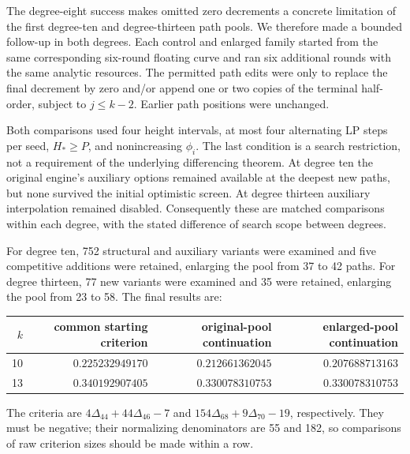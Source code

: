 \documentclass[11pt,letterpaper]{article}
\numberwithin{equation}{section}
\begin{document}
The degree-eight success makes omitted zero decrements a concrete limitation
of the first degree-ten and degree-thirteen path pools. We therefore made a
bounded follow-up in both degrees. Each control and enlarged family started
from the same corresponding six-round floating curve and ran six additional
rounds with the same analytic resources. The permitted path edits were only
to replace the final decrement by zero and/or append one or two copies of
the terminal half-order, subject to $j\le k-2$. Earlier path positions were
unchanged.

Both comparisons used four height intervals, at most four alternating LP
steps per seed, $H_*\ge P$, and nonincreasing $\phi_i$. The last condition
is a search restriction, not a requirement of the underlying differencing
theorem. At degree ten the original engine's auxiliary options remained
available at the deepest new paths, but none survived the initial optimistic
screen. At degree thirteen auxiliary interpolation remained disabled.
Consequently these are matched comparisons within each degree, with the
stated difference of search scope between degrees.

For degree ten, 752 structural and auxiliary variants were examined and
five competitive additions were retained, enlarging the pool from 37 to 42
paths. For degree thirteen, 77 new variants were examined and 35 were
retained, enlarging the pool from 23 to 58. The final results are:
\begin{center}
\small
\begin{tabular}{rrrr}
\toprule
$k$ & common starting criterion & original-pool continuation
    & enlarged-pool continuation\\
\midrule
10 & $0.225232949170$ & $0.212661362045$ & $0.207688713163$\\
13 & $0.340192907405$ & $0.330078310753$ & $0.330078310753$\\
\bottomrule
\end{tabular}
\end{center}
The criteria are $4\Delta_{44}+44\Delta_{46}-7$ and
$154\Delta_{68}+9\Delta_{70}-19$, respectively. They must be negative;
their normalizing denominators are 55 and 182, so comparisons of raw
criterion sizes should be made within a row.
\end{document}
